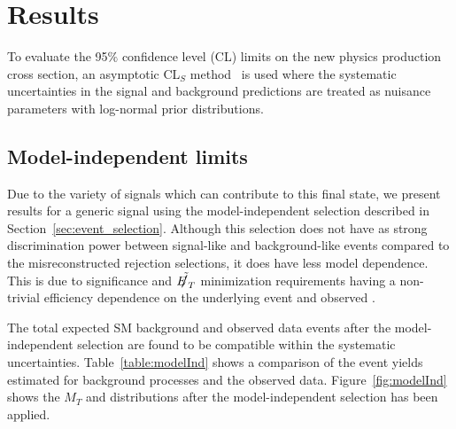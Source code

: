 \section{Results}

    To evaluate the 95$\%$ confidence level (CL) limits on the new physics production cross section, an asymptotic CL$_{S}$ method~\cite{cls,cls1} is used where the systematic uncertainties in the signal and background predictions are treated as nuisance parameters with log-normal prior distributions. %

\subsection{Model-independent limits}

  Due to the variety of signals which can contribute to this final state, we present results for a generic signal using the model-independent selection described in Section~\ref{sec:event_selection}. Although this selection does not have as strong discrimination power between signal-like and background-like events compared to the misreconstructed \met rejection selections, it does have less model dependence. This is due to \met significance and $\tilde{\met}$ minimization requirements having a non-trivial efficiency dependence on the underlying event and observed \met.

  The total expected SM background and observed data events after the model-independent selection are found to be compatible within the systematic uncertainties. Table~\ref{table:modelInd} shows a comparison of the event yields estimated for background processes and the observed data. Figure~\ref{fig:modelInd} shows the $M_{T}$ and \met distributions after the model-independent selection has been applied.



